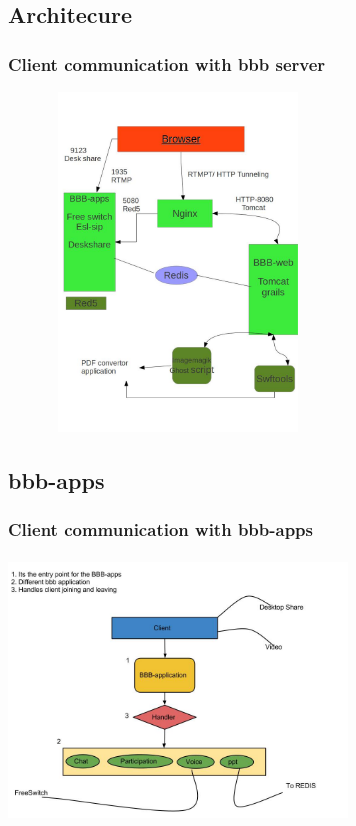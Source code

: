 \documentclass{beamer}
\begin{document}

\subsection*{Architecure}
\begin{frame}
\frametitle{Client communication with bbb server }
\begin{small}

\includegraphics[height=90mm,width=90mm,angle=360]{./images/bbb-arch.jpg}
\end{small}
\end{frame}


\subsection*{bbb-apps}
\begin{frame}
\frametitle{Client communication with bbb-apps }
\begin{small}

\includegraphics[height=70mm,width=90mm,angle=360]{./images/bbb-apps.jpg}
\end{small}
\end{frame}
\end{document}
